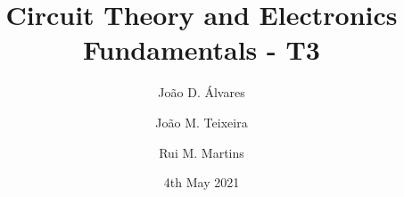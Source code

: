 \title{\textbf{Circuit Theory and Electronics Fundamentals - T3}}
\author[1]{João D. Álvares}
\author[1]{João M. Teixeira}
\author[1]{Rui M. Martins}


\date{4th May 2021}